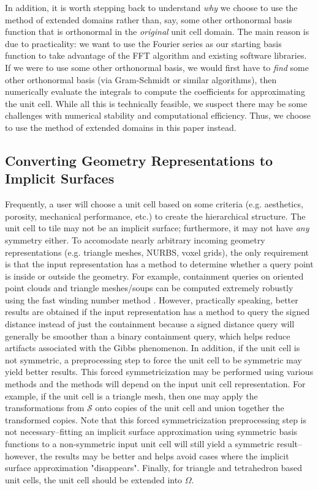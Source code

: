 \documentclass[acmtog]{acmart}
\begin{document}
In addition, it is worth stepping back to understand \textit{why} we choose to use the method of extended domains rather than, say, some other orthonormal basis function that is orthonormal in the \textit{original} unit cell domain. The main reason is due to practicality: we want to use the Fourier series as our starting basis function to take advantage of the FFT algorithm and existing software libraries. If we were to use some other orthonormal basis, we would first have to \textit{find} some other orthonormal basis (via Gram-Schmidt or similar algorithms), then numerically evaluate the integrals to compute the coefficients for approximating the unit cell. While all this is technically feasible, we suspect there may be some challenges with numerical stability and computational efficiency. Thus, we choose to use the method of extended domains in this paper instead.

\subsection{Converting Geometry Representations to Implicit Surfaces}
\label{sec:converting_geometry}

Frequently, a user will choose a unit cell based on some criteria (e.g. aesthetics, porosity, mechanical performance, etc.) to create the hierarchical structure. The unit cell to tile may not be an implicit surface; furthermore, it may not have \textit{any} symmetry either. To accomodate nearly arbitrary incoming geometry representations (e.g. triangle meshes, NURBS, voxel grids), the only requirement is that the input representation has a method to determine whether a query point is inside or outside the geometry. For example, containment queries on oriented point clouds and triangle meshes/soups can be computed extremely robustly using the fast winding number method \cite{barill2018fast}. However, practically speaking, better results are obtained if the input representation has a method to query the signed distance instead of just the containment because a signed distance query will generally be smoother than a binary containment query, which helps reduce artifacts associated with the Gibbs phenomenon. In addition, if the unit cell is not symmetric, a preprocessing step to force the unit cell to be symmetric may yield better results. This forced symmetricization may be performed using various methods and the methods will depend on the input unit cell representation. For example, if the unit cell is a triangle mesh, then one may apply the transformations from $\mathcal{S}$ onto copies of the unit cell and union together the transformed copies. Note that this forced symmetricization preprocessing step is not necessary--fitting an implicit surface approximation using symmetric basis functions to a non-symmetric input unit cell will still yield a symmetric result--however, the results may be better and helps avoid cases where the implicit surface approximation "disappears". Finally, for triangle and tetrahedron based unit cells, the unit cell should be extended into $\Omega$.
\end{document}
